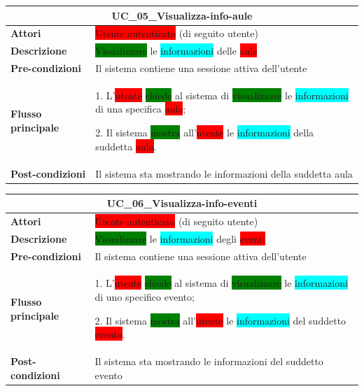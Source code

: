 \documentclass[11pt]{article}
\begin{document}
\begin{table}[H]
\centering
\begin{tabularx}{1\textwidth}{|l|X|}
\hline
\multicolumn{2}{|c|}{\textbf{UC\_05\_Visualizza-info-aule}}\\
\hline \textbf{Attori} & \colorbox{red}{Utente autenticato} (di seguito utente)\\
\hline \textbf{Descrizione} & \colorbox{green}{Visualizzare} le \colorbox{cyan}{informazioni} delle \colorbox{red}{aule}\\
\hline \textbf{Pre-condizioni} & Il sistema contiene una sessione attiva dell'utente\\
\hline \textbf{Flusso principale} & 
1. L'\colorbox{red}{utente} \colorbox{green}{chiede} al sistema di \colorbox{green}{visualizzare} le \colorbox{cyan}{informazioni} di una specifica \colorbox{red}{aula};

2. Il sistema \colorbox{green}{mostra} all'\colorbox{red}{utente} le \colorbox{cyan}{informazioni} della suddetta \colorbox{red}{aula}.
\\
\hline \textbf{Post-condizioni} & Il sistema sta mostrando le informazioni della suddetta aula\\
\hline
\end{tabularx}
\end{table}

\begin{table}[H]
\centering
\begin{tabularx}{1\textwidth}{|l|X|}
\hline
\multicolumn{2}{|c|}{\textbf{UC\_06\_Visualizza-info-eventi}}\\
\hline \textbf{Attori} & \colorbox{red}{Utente autenticato} (di seguito utente)\\
\hline \textbf{Descrizione} & \colorbox{green}{Visualizzare} le \colorbox{cyan}{informazioni} degli \colorbox{red}{eventi}\\
\hline \textbf{Pre-condizioni} & Il sistema contiene una sessione attiva dell'utente\\
\hline \textbf{Flusso principale} & 
1. L'\colorbox{red}{utente} \colorbox{green}{chiede} al sistema di \colorbox{green}{visualizzare} le \colorbox{cyan}{informazioni} di uno specifico {evento};

2. Il sistema \colorbox{green}{mostra} all'\colorbox{red}{utente} le \colorbox{cyan}{informazioni} del suddetto \colorbox{red}{evento}.
\\
\hline \textbf{Post-condizioni} & Il sistema sta mostrando le informazioni del suddetto evento\\
\hline
\end{tabularx}
\end{table}
\end{document}
